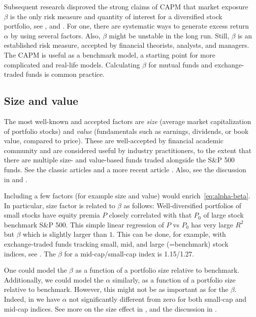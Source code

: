 \documentclass[12pt]{amsart}
\begin{document}
Subsequent research disproved  the strong claims of CAPM that market exposure $\beta$ is the only risk measure and quantity of interest for a diversified stock portfolio, see \cite{FF1993, FF2004}, and \cite[Chapter 7]{Ang}. For one, there are systematic ways to generate excess return $\alpha$ by using several factors. Also, $\beta$ might be unstable in the long run. Still, $\beta$ is an established risk measure, accepted by financial theorists, analysts, and managers. The CAPM is useful as a benchmark model, a starting point for more complicated and real-life models. Calculating $\beta$ for mutual funds and exchange-traded funds is common practice. 

\subsection{Size and value} The most well-known and accepted factors are {\it size} (average market capitalization of portfolio stocks) and {\it value} (fundamentals such as earnings, dividends, or book value, compared to price). These are well-accepted by financial academic community and are considered useful by industry practitioners, to the extent that there are multiple size- and value-based funds traded alongside the S\&P 500 funds. See the classic articles \cite{Banz, FF1993} and a more recent article \cite{FF2015}. Also, see the discussion in \cite{Ang} and \cite{Siegel}. 

Including a few factors (for example size and value) would enrich~\eqref{eq:alpha-beta}. In particular, size factor is related to $\beta$ as follows: Well-diversified portfolios of small stocks have equity premia $P$ closely correlated with that $P_0$ of large stock benchmark S\&P 500. This simple linear regression of $P$ vs $P_0$ has very large $R^2$ but $\beta$ which is slightly larger than $1$. This can be done, for example, with exchange-traded funds tracking small, mid, and large (=benchmark) stock indices, see \cite[Appendix]{CAPM-size}. The $\beta$ for a mid-cap/small-cap index is 1.15/1.27.  

One could model the $\beta$ as a function of a portfolio size relative to benchmark. Additionally, we could model the $\alpha$ similarly, as a function of a portfolio size relative to benchmark. However, this might not be as important as for the $\beta$. Indeed, in \cite[Appendix]{CAPM-size} we have $\alpha$ not significantly different from zero for both small-cap and mid-cap indices. See more on the size effect in \cite{Semenov}, and the discussion in \cite[Chapter 8]{Ang}.
\end{document}
